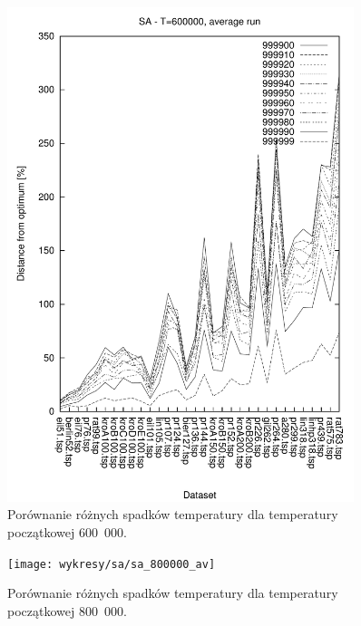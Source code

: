 \begin{figure}
\begin{center}
\includegraphics[width=0.9\textwidth]{wykresy/sa/sa_600000_av}
\end{center}
\caption{Porównanie różnych spadków temperatury dla temperatury początkowej 600~000.}
\label{sa_600000_av}
\end{figure}


\begin{figure}
\begin{center}
\texttt{[image: wykresy/sa/sa\_800000\_av]}
\end{center}
\caption{Porównanie różnych spadków temperatury dla temperatury początkowej 800~000.}
\label{sa_800000_av}
\end{figure}

